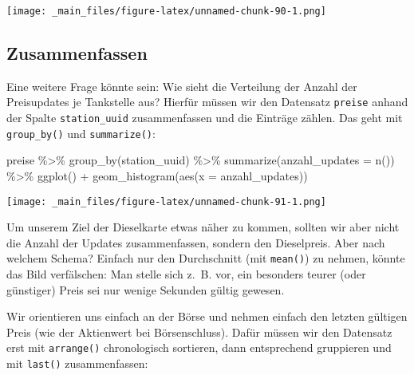 \documentclass[11pt,german,a4paper]{article}
\newenvironment{Shaded}{\begin{snugshade}}{\end{snugshade}}
\newcommand{\AttributeTok}[1]{\textcolor[rgb]{0.77,0.63,0.00}{#1}}
\newcommand{\FunctionTok}[1]{\textcolor[rgb]{0.00,0.00,0.00}{#1}}
\newcommand{\NormalTok}[1]{#1}
\newcommand{\SpecialCharTok}[1]{\textcolor[rgb]{0.00,0.00,0.00}{#1}}
\begin{document}
\texttt{[image: \_main\_files/figure-latex/unnamed-chunk-90-1.png]}

\hypertarget{zusammenfassen}{%
\subsection{Zusammenfassen}\label{zusammenfassen}}

Eine weitere Frage könnte sein: Wie sieht die Verteilung der Anzahl der Preisupdates je Tankstelle aus? Hierfür müssen wir den Datensatz \texttt{preise} anhand der Spalte \texttt{station\_uuid} zusammenfassen und die Einträge zählen. Das geht mit \texttt{group\_by()} und \texttt{summarize()}:

\begin{Shaded}
\begin{Highlighting}[]
\NormalTok{preise }\SpecialCharTok{\%\textgreater{}\%}
  \FunctionTok{group\_by}\NormalTok{(station\_uuid) }\SpecialCharTok{\%\textgreater{}\%}
  \FunctionTok{summarize}\NormalTok{(}\AttributeTok{anzahl\_updates =} \FunctionTok{n}\NormalTok{()) }\SpecialCharTok{\%\textgreater{}\%}
  \FunctionTok{ggplot}\NormalTok{() }\SpecialCharTok{+}
    \FunctionTok{geom\_histogram}\NormalTok{(}\FunctionTok{aes}\NormalTok{(}\AttributeTok{x =}\NormalTok{ anzahl\_updates))}
\end{Highlighting}
\end{Shaded}

\texttt{[image: \_main\_files/figure-latex/unnamed-chunk-91-1.png]}

Um unserem Ziel der Dieselkarte etwas näher zu kommen, sollten wir aber nicht die Anzahl der Updates zusammenfassen, sondern den Dieselpreis.
Aber nach welchem Schema?
Einfach nur den Durchschnitt (mit \texttt{mean()}) zu nehmen, könnte das Bild verfälschen: Man stelle sich z.~B. vor, ein besonders teurer (oder günstiger) Preis sei nur wenige Sekunden gültig gewesen.

Wir orientieren uns einfach an der Börse und nehmen einfach den letzten gültigen Preis (wie der Aktienwert bei Börsenschluss).
Dafür müssen wir den Datensatz erst mit \texttt{arrange()} chronologisch sortieren, dann entsprechend gruppieren und mit \texttt{last()} zusammenfassen:
\end{document}
